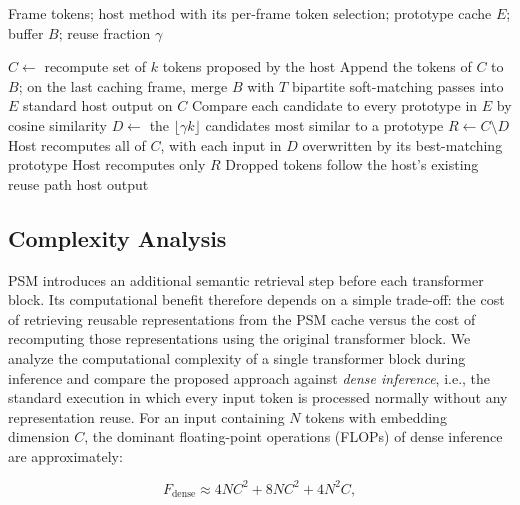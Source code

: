 \documentclass[letterpaper]{article}
\begin{document}
\begin{algorithm}[t]
\caption{Layered Semantic Memory Inference}
\label{alg:layered}
\begin{algorithmic}[1]
\Require
  Frame tokens; host method with its per-frame token selection;
  prototype cache $E$; buffer $B$; reuse fraction $\gamma$
 
\State $C \gets$ recompute set of $k$ tokens proposed by the host
  \hfill{}
  \State Append the tokens of $C$ to $B$; on the last caching frame,
    merge $B$ with $T$ bipartite soft-matching passes into $E$
  \State \Return standard host output on $C$
\Else
  \State Compare each candidate to every prototype in $E$
    by cosine similarity
  \State $D \gets$ the $\lfloor \gamma k \rfloor$ candidates most similar
    to a prototype
    \hfill{}
  \State $R \gets C \setminus D$
    \hfill{}
    \State Host recomputes all of $C$, with each input in $D$
      overwritten by its best-matching prototype
  \Else
    \State Host recomputes only $R$
  \EndIf
  \State Dropped tokens follow the host's existing reuse path
  \State \Return host output
\EndIf
\end{algorithmic}
\end{algorithm}
 
  
 
\subsection{Complexity Analysis}
\label{sec:complexity}
 
PSM introduces an additional semantic retrieval step before each transformer block. Its computational benefit therefore depends on a simple trade-off: the cost of retrieving reusable representations from the PSM cache versus the cost of recomputing those representations using the original transformer block.
%
We analyze the computational complexity of a single transformer block during inference and compare the proposed approach against \emph{dense inference}, i.e., the standard execution in which every input token is processed normally without any representation reuse. For an input containing $N$ tokens with embedding dimension $C$, the dominant floating-point operations (FLOPs) of dense inference are
approximately:
 
\begin{equation}
F_{\mathrm{dense}}
\approx
4NC^2
+
8NC^2
+
4N^2C,
\end{equation}
 
\end{document}
